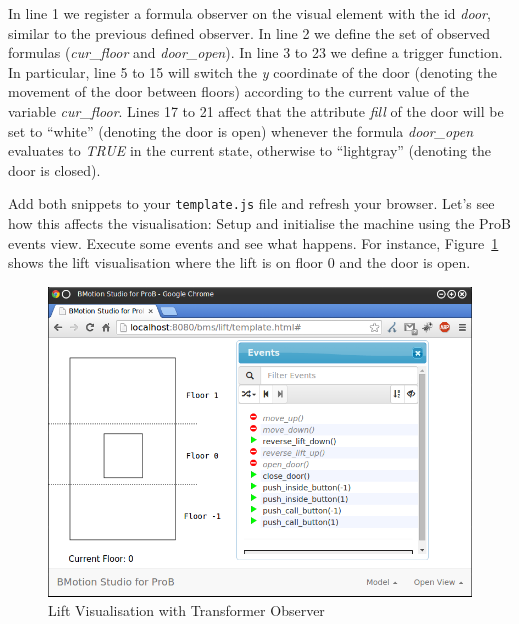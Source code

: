 In line 1 we register a formula observer on the visual element with the id \textit{door}, similar to the previous defined observer.
In line 2 we define the set of observed formulas (\textit{cur\_floor} and \textit{door\_open}).
In line 3 to 23 we define a trigger function.
In particular, line 5 to 15 will switch the \textit{y} coordinate of the door (denoting the movement of the door between floors) according to the current value of the variable \textit{cur\_floor}.
Lines 17 to 21 affect that the attribute \textit{fill} of the door will be set to ``white'' (denoting the door is open) whenever the formula \textit{door\_open} evaluates to \textit{TRUE} in the current state, otherwise to ``lightgray'' (denoting the door is closed).

Add both snippets to your \texttt{template.js} file and refresh your browser.
Let's see how this affects the visualisation:
Setup and initialise the machine using the ProB events view.
Execute some events and see what happens.
For instance, Figure~\ref{fig_tut_04_running2} shows the lift visualisation where the lift is on floor 0 and the door is open.

\begin{figure}[!ht]
\begin{center}
	\includegraphics[width=12cm]{img/tutorial/tut_04.png}
	\caption{Lift Visualisation with Transformer Observer}
	\label{fig_tut_04_running2}
\end{center}
\end{figure}


